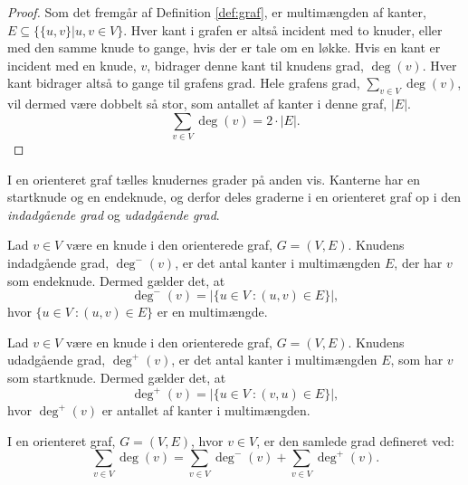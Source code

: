 \begin{proof}
Som det fremgår af Definition \ref{def:graf}, er multimængden af kanter, $E \subseteq \{\{u,v\}|u,v \in V \}$. Hver kant i grafen er altså incident med to knuder, eller med den samme knude to gange, hvis der er tale om en løkke. Hvis en kant er incident med en knude, $v$, bidrager denne kant til knudens grad, $\deg(v)$. Hver kant bidrager altså to gange til grafens grad. Hele grafens grad, $\sum_{v \in V} { } \deg(v)$, vil dermed være dobbelt så stor, som antallet af kanter i denne graf, $|E|$. 
\begin{equation}
\sum_{v \in V} { } \deg(v) = 2 \cdot |E|.
\end{equation} 
\end{proof}

I en orienteret graf tælles knudernes grader på anden vis. Kanterne har en startknude og en endeknude, og derfor deles graderne i en orienteret graf op i den \emph{indadgående grad} og \emph{udadgående grad}. 

\begin{defn}
Lad $v \in V$ være en knude i den orienterede graf, $G = (V,E)$. Knudens indadgående grad, $\deg^-(v)$, er det antal kanter i multimængden $E$, der har $v$ som endeknude. Dermed gælder det, at
\begin{equation}
\deg^-(v)=|\{u \in V\ : (u,v) \in E \}|,
\end{equation}
hvor $\{u \in V\ : (u,v) \in E \}$ er en multimængde.
\end{defn}

\begin{defn}
Lad $v \in V$ være en knude i den orienterede graf, $G = (V,E)$. Knudens udadgående grad, $\deg^+(v)$, er det antal kanter i multimængden $E$, som har $v$ som startknude. Dermed gælder det, at
\begin{equation}
\deg^+(v)=|\{u \in V\ : (v,u) \in E \}|,
\end{equation}
hvor $\deg^+(v)$ er antallet af kanter i multimængden.
\end{defn}

\begin{defn}
I en orienteret graf, $G = (V,E)$, hvor $v \in V$, er den samlede grad defineret ved: 
\begin{equation}
\sum_{v \in V} { } \deg(v) = \sum_{v \in V} { } \deg^{-}(v) + \sum_{v \in V} { } \deg^{+}(v).
\end{equation}
\end{defn}

